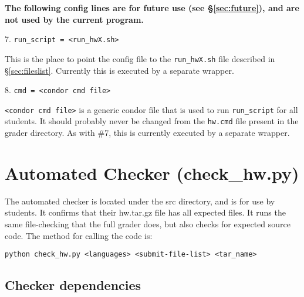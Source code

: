 \documentclass[12pt]{article}
\begin{document}
\vspace{5pt}

\noindent \textbf{The following config lines are for future use (see \S\ref{sec:future}), and are not used by the current program.}

\vspace{5pt}

7. \texttt{run\_script = <run\_hwX.sh>}

This is the place to point the config file to the \texttt{run\_hwX.sh} file described in \S\ref{sec:fileslist}. Currently this is executed by a separate wrapper.

\vspace{5pt}

8. \texttt{cmd = <condor cmd file>}

\texttt{<condor cmd file>} is a generic condor file that is used to run \texttt{run\_script} for all students. It should probably never be changed from the \texttt{hw.cmd} file present in the grader directory. As with \#7, this is currently executed by a separate wrapper.

\vspace{5pt}

\section{Automated Checker (check\_hw.py)} \label{sec:checker}

The automated checker is located under the src directory, and is for use by students. It confirms that their hw.tar.gz file has all expected files. It runs the same file-checking that the full grader does, but also checks for expected source code. The method for calling the code is:

\texttt{python check\_hw.py <languages> <submit-file-list> <tar\_name>}

\subsection{Checker dependencies}
\end{document}
